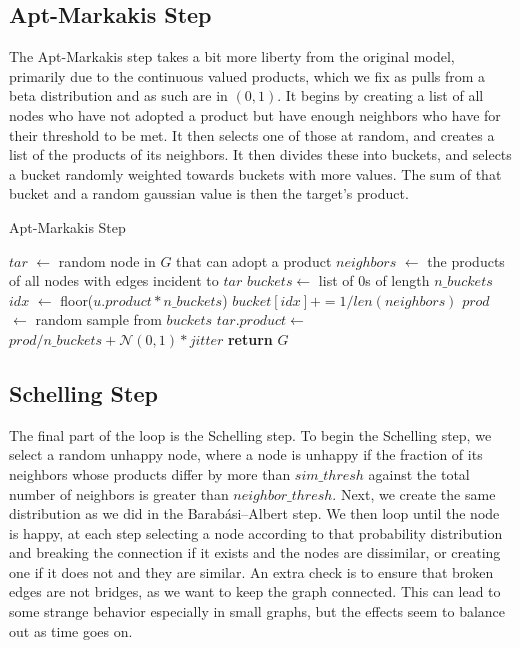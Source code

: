 \documentclass[12pt,twoside]{report}
\begin{document}
\subsection{Apt-Markakis Step}

The Apt-Markakis step takes a bit more liberty from the original model, primarily due to the continuous valued products, which we fix as pulls from a beta distribution and as such are in $(0,1)$. It begins by creating a list of all nodes who have not adopted a product but have enough neighbors who have for their threshold to be met. It then selects one of those at random, and creates a list of the products of its neighbors. It then divides these into buckets, and selects a bucket randomly weighted towards buckets with more values. The sum of that bucket and a random gaussian value is then the target's product. \\

\begin{algorithm}
\caption{Apt-Markakis Step}
\begin{algorithmic}
\State $tar$ $\gets$ random node in $G$ that can adopt a product
\State $neighbors$ $\gets$ the products of all nodes with edges incident to $tar$
\State $buckets \gets $ list of 0s of length $n\_buckets$
\State $idx$ $\gets$ floor($u.product * n\_buckets$)
\State $bucket[idx] += 1 / len(neighbors)$
\EndFor
\State $prod$ $\gets$ random sample from $buckets$
\State $tar.product \gets$ $prod / n\_buckets + \mathcal{N}(0,1) * jitter$
\State \textbf{return} $G$
\EndFunction
\end{algorithmic}
\end{algorithm}

\subsection{Schelling Step}

The final part of the loop is the Schelling step. To begin the Schelling step, we select a random unhappy node, where a node is unhappy if the fraction of its neighbors whose products differ by more than $sim\_thresh$ against the total number of neighbors is greater than $neighbor\_thresh$. Next, we create the same distribution as we did in the Barabási–Albert step. We then loop until the node is happy, at each step selecting a node according to that probability distribution and breaking the connection if it exists and the nodes are dissimilar, or creating one if it does not and they are similar. An extra check is to ensure that broken edges are not bridges, as we want to keep the graph connected. This can lead to some strange behavior especially in small graphs, but the effects seem to balance out as time goes on. \\
\end{document}
